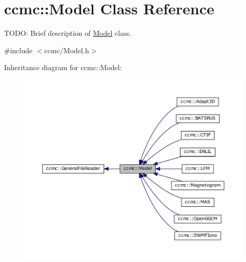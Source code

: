 \hypertarget{classccmc_1_1_model}{\section{ccmc\-:\-:Model Class Reference}
\label{classccmc_1_1_model}
}


T\-O\-D\-O\-: Brief description of \hyperlink{classccmc_1_1_model}{Model} class.  




{\ttfamily \#include $<$ccmc/\-Model.\-h$>$}



Inheritance diagram for ccmc\-:\-:Model\-:
\nopagebreak
\begin{figure}[H]
\begin{center}
\leavevmode
\includegraphics[width=350pt]{classccmc_1_1_model__inherit__graph}
\end{center}
\end{figure}


